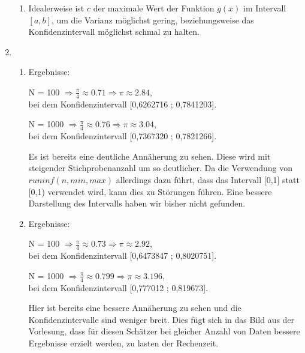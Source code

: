 \documentclass[a4paper]{scrartcl}
\def \blattnr {11}
\begin{document}
\begin{enumerate}[label=\bfseries \blattnr.\arabic*]
\begin{enumerate}
     \item %
	 Idealerweise ist $c$ der maximale Wert der Funktion $g(x)$ im Intervall 
	 $[a,b]$, um die Varianz möglichst gering, beziehungsweise das 
	 Konfidenzintervall möglichst schmal zu halten.
     
    \end{enumerate}
  \item %
    \begin{enumerate}
     \item %
         
         
         Ergebnisse:
         
         N = 100 $\Rightarrow \frac\pi4 \approx 0.71 \Rightarrow \pi \approx 2.84$, \\
         bei dem Konfidenzintervall [0,6262716 ; 0,7841203].
         
         N = 1000 $\Rightarrow \frac\pi4 \approx 0.76 \Rightarrow \pi \approx 3.04$, \\
         bei dem Konfidenzintervall [0,7367320 ; 0,7821266].
         
         Es ist bereits eine deutliche Annäherung zu sehen. Diese wird mit steigender 
         Stichprobenanzahl um so deutlicher. Da die Verwendung von $runinf(n,min,max)$ 
         allerdings dazu führt, dass das Intervall [0,1] statt [0,1) verwendet wird,
         kann dies zu Störungen führen. Eine bessere Darstellung des Intervalls haben 
         wir bisher nicht gefunden.
     
     \pagebreak
     \item %
	 
         
         Ergebnisse:
         
         N = 100 $\Rightarrow \frac\pi4 \approx 0.73 \Rightarrow \pi \approx 2.92$, \\
         bei dem Konfidenzintervall [0,6473847 ;  0,8020751].
         
         N = 1000 $\Rightarrow \frac\pi4 \approx 0.799 \Rightarrow \pi \approx 3.196$, \\
         bei dem Konfidenzintervall [0,777012 ; 0,819673].
         
         Hier ist bereits eine bessere Annäherung zu sehen und die Konfidenzintervalle 
         sind weniger breit. Dies fügt sich in das Bild aus der Vorlesung, dass für diesen 
         Schätzer bei gleicher Anzahl von Daten bessere Ergebnisse erzielt werden, zu lasten 
         der Rechenzeit.
         

\end{enumerate}
\end{enumerate}
\end{document}
